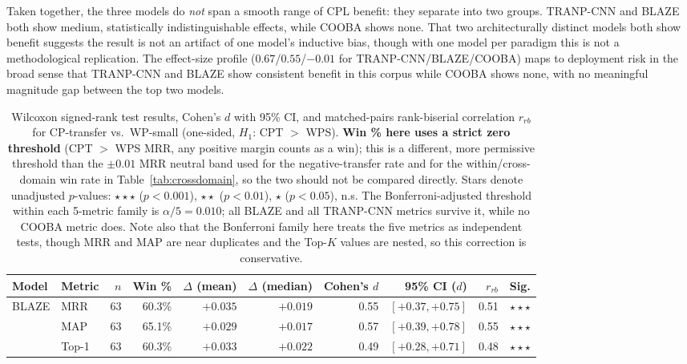 \documentclass[a4paper,fleqn]{cas-dc}
\begin{document}
 Taken together, the three models do \emph{not} span a smooth
range of CPL benefit: they separate into two groups. TRANP-CNN and BLAZE both
show medium, statistically indistinguishable effects, while COOBA shows none.
That two architecturally distinct
models both show benefit suggests the result is not an artifact of one
model's inductive bias, though with one model per paradigm this is not a
methodological replication. The effect-size profile
($0.67$/$0.55$/$-0.01$ for TRANP-CNN/BLAZE/COOBA) maps to deployment
risk in the broad sense that TRANP-CNN and BLAZE show consistent
benefit in this corpus while COOBA shows none, with no meaningful magnitude gap
between the top two models.

\begin{table}[t]
\centering
\caption{Wilcoxon signed-rank test results, Cohen's $d$ with 95\% CI, and matched-pairs
rank-biserial correlation $r_{rb}$ for CP-transfer vs.\ WP-small
(one-sided, $H_1$: CPT $>$ WPS). \textbf{Win \% here uses a strict zero threshold} (CPT
$>$ WPS MRR, any positive margin counts as a win); this is a different, more
permissive threshold than the $\pm 0.01$ MRR neutral band used for the
negative-transfer rate and for the within/cross-domain win rate in
Table~\ref{tab:crossdomain}, so the two should not be compared directly.
Stars denote unadjusted $p$-values:
$\star\star\star$ ($p < 0.001$), $\star\star$ ($p < 0.01$), $\star$ ($p < 0.05$), n.s.
The Bonferroni-adjusted threshold within each 5-metric family is $\alpha/5 = 0.010$;
all BLAZE and all TRANP-CNN metrics survive it, while no COOBA metric does.
Note also that the Bonferroni family here
treats the five metrics as independent tests, though MRR and MAP are near
duplicates and the Top-$K$ values are nested, so this correction is
conservative.}
\label{tab:wilcoxon}
\small
\begin{tabular}{@{}llrrrrrrrr@{}}
\toprule
\textbf{Model} & \textbf{Metric} & \textbf{$n$} & \textbf{Win \%} & \textbf{$\Delta$ (mean)} & \textbf{$\Delta$ (median)} & \textbf{Cohen's $d$} & \textbf{95\% CI ($d$)} & \textbf{$r_{rb}$} & \textbf{Sig.} \\
\midrule
\multirow{5}{*}{BLAZE}
  & MRR    & 63 & 60.3\% & $+0.035$ & $+0.019$ & 0.55 & $[{+}0.37,{+}0.75]$ & 0.51 & $\star\star\star$ \\
  & MAP    & 63 & 65.1\% & $+0.029$ & $+0.017$ & 0.57 & $[{+}0.39,{+}0.78]$ & 0.55 & $\star\star\star$ \\
  & Top-1  & 63 & 60.3\% & $+0.033$ & $+0.022$ & 0.49 & $[{+}0.28,{+}0.71]$ & 0.48 & $\star\star\star$ \\

\end{tabular}
\end{table}
\end{document}
